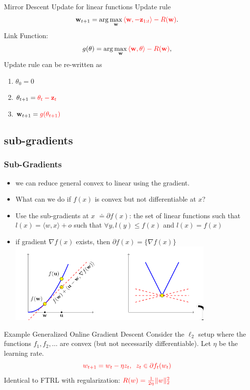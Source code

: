 \documentclass[handout]{beamer}
\begin{document}
\begin{small}
\begin{frame}{Mirror Descent Update for linear functions}
  Update rule
  \[
    \mathbf{w}_{t+1} = \arg\max_{\mathbf{w}} \textcolor{mathcolor}{ \langle \mathbf{w}, -\mathbf{z}_{1:t} \rangle - R(\mathbf{w}) }.
  \]
Link Function:
\[
g(\theta) = \arg\max_{\mathbf{w}} \textcolor{mathcolor}{ \langle \mathbf{w}, \theta \rangle - R(\mathbf{w}) },
\]
Update rule can be re-written as
\begin{enumerate}
  \item $\theta_0=0$
    \item \( \theta_{t+1} = \textcolor{mathcolor}{\theta_t - \mathbf{z}_t} \)
    \item \( \mathbf{w}_{t+1} = \textcolor{mathcolor}{g(\theta_{t+1})} \)
\end{enumerate}
\end{frame}

\subsection{sub-gradients}
\begin{frame}
  \frametitle{Sub-Gradients}
  \begin{itemize}
  \item we can reduce general convex to linear using the gradient.
  \item   What can we do if $f(x)$ is convex but not differentiable at $x$?
  \item Use the sub-gradients at $x$ $\doteq\partial f(x)$: the set of linear functions such that
    $l(x)=\langle w,x \rangle + o$ such that
    $\forall y, l(y) \leq f(x)$ and $l(x) = f(x)$
  \item if gradient $\nabla f(x)$ exists, then $\partial f(x) = \{\nabla f(x)\}$
    \includegraphics[width=0.8\textwidth]{figures/SubGradient.png}
  \end{itemize}
  
\end{frame}


\begin{frame}{Example Generalized Online Gradient Descent}
  Consider the $\ell_2$ setup where the functions $f_1,f_2,\ldots$ are convex (but not necessarily differentiable).
  Let $\eta$ be the learning rate.
\[
  \textcolor{red}{w_{t+1} = w_t - \eta z_t,\;\;
    z_t \in \partial f_t(w_t)}
\]
Identical to FTRL with regularization: $\textcolor{red}{R(w) = \frac{1}{2\eta}\|w\|_2^2}$


\end{frame}
\end{small}
\end{document}
